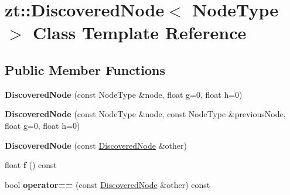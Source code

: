 \hypertarget{classzt_1_1_discovered_node}{}\section{zt\+:\+:Discovered\+Node$<$ Node\+Type $>$ Class Template Reference}
\label{classzt_1_1_discovered_node}
\subsection*{Public Member Functions}
\begin{DoxyCompactItemize}
\item 
\mbox{\label{classzt_1_1_discovered_node_acc9dce4d6f7e699242fb152f5efea7f2}} 
{\bfseries Discovered\+Node} (const Node\+Type \&node, float g=0, float h=0)
\item 
\mbox{\label{classzt_1_1_discovered_node_a436ccf9eba587d174a4878a6159f6d66}} 
{\bfseries Discovered\+Node} (const Node\+Type \&node, const Node\+Type \&previous\+Node, float g=0, float h=0)
\item 
\mbox{\label{classzt_1_1_discovered_node_ac6140ccb435b77f07f46ef586dd2d229}} 
{\bfseries Discovered\+Node} (const \hyperlink{classzt_1_1_discovered_node}{Discovered\+Node} \&other)
\item 
\mbox{\label{classzt_1_1_discovered_node_aeba9dd862ef02be644eb60a0f00c3755}} 
float {\bfseries f} () const
\item 
\mbox{\label{classzt_1_1_discovered_node_a66ffa8ece48f93dc68cdca70b5926b55}} 
bool {\bfseries operator==} (const \hyperlink{classzt_1_1_discovered_node}{Discovered\+Node} \&other) const
\end{DoxyCompactItemize}
